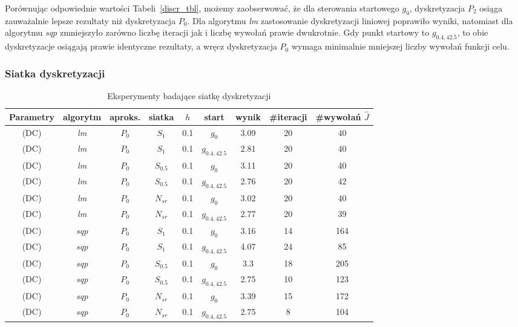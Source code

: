 \documentclass[11pt]{article}
\begin{document}
Porównując odpowiednie wartości Tabeli~\ref{discr_tbl}, możemy zaobserwować, że dla sterowania startowego $g_0$, dyskretyzacja $P_2$ osiąga zauważalnie lepsze rezultaty niż dyskretyzacja $P_0$. Dla algorytmu {\it lm\/} zastosowanie dyskretyzacji liniowej poprawiło wyniki, natomiast dla algorytmu {\it sqp\/} zmniejszyło zarówno liczbę iteracji jak i liczbę wywołań prawie dwukrotnie. Gdy punkt startowy to $g_{0.4,42.5}$, to obie dyskretyzacje osiągają prawie identyczne rezultaty, a wręcz dyskretyzacja $P_0$ wymaga minimalnie mniejszej liczby wywołań funkcji celu. 

\subsubsection{Siatka dyskretyzacji}

\begin{table}[h!]
  \begin{center}
    \begin{tabular}{|c|c|c|c|c|c|c|c|c|}
      \hline
      Parametry & algorytm & aproks. & siatka & $h$ & start & wynik & \#iteracji & \#wywołań $\hat{J}$ \\
      \hline
      (DC) & {\it lm\/} & $P_0$ & $S_1$ & 0.1 & $g_0$ & 3.09 & 20 & 40 \\
      \hline
      (DC) & {\it lm\/} & $P_0$ & $S_1$ & 0.1 & $g_{0.4,42.5}$ & 2.81 & 20 & 40 \\
      \hline
      (DC) & {\it lm\/} & $P_0$ & $S_{0.5}$ & 0.1 & $g_0$ & 3.11 & 20 & 40 \\
      \hline
      (DC) & {\it lm\/} & $P_0$ & $S_{0.5}$ & 0.1 & $g_{0.4,42.5}$ & 2.76 & 20 & 42 \\
      \hline
      (DC) & {\it lm\/} & $P_0$ & $N_{sr}$ & 0.1 & $g_0$ & 3.02 & 20 & 40 \\
      \hline
      (DC) & {\it lm\/} & $P_0$ & $N_{sr}$ & 0.1 & $g_{0.4,42.5}$ & 2.77 & 20 & 39 \\
      \hline
      (DC) & {\it sqp\/} & $P_0$ & $S_1$ & 0.1 & $g_0$ & 3.16 & 14 & 164 \\
      \hline
      (DC) & {\it sqp\/} & $P_0$ & $S_1$ & 0.1 & $g_{0.4,42.5}$ & 4.07 & 24 & 85 \\
      \hline
      (DC) & {\it sqp\/} & $P_0$ & $S_{0.5}$ & 0.1 & $g_0$ & 3.3 & 18 & 205 \\
      \hline
      (DC) & {\it sqp\/} & $P_0$ & $S_{0.5}$ & 0.1 & $g_{0.4,42.5}$ & 2.75 & 10 & 123 \\
      \hline
      (DC) & {\it sqp\/} & $P_0$ & $N_{sr}$ & 0.1 & $g_0$ & 3.39 & 15 & 172 \\
      \hline
      (DC) & {\it sqp\/} & $P_0$ & $N_{sr}$ & 0.1 & $g_{0.4,42.5}$ & 2.75 & 8 & 104 \\
      \hline
    \end{tabular}
    \caption{Eksperymenty badające siatkę dyskretyzacji}\label{grid_tbl}
  \end{center}
\end{table}
\end{document}

